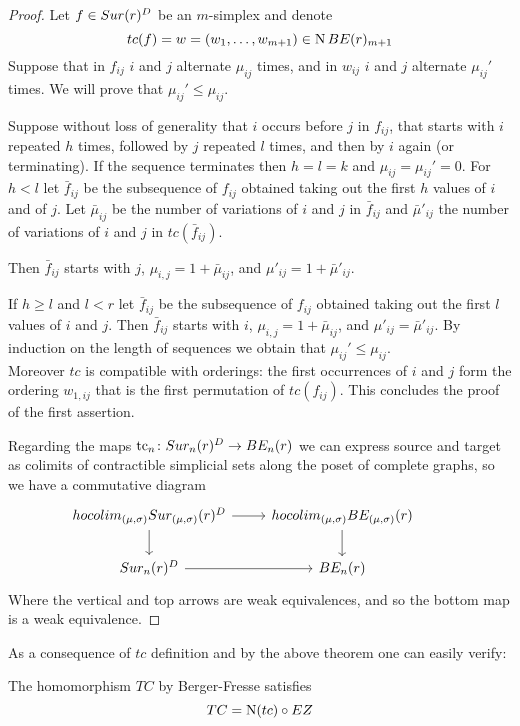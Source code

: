 \begin{proof}
	Let $f\in Sur(r)^{D}$ be an $m$-simplex and denote
	$$tc(f)=w=(w_{1},\dots,w_{m+1})\in \operatorname{N}BE(r)_{m+1}$$
	Suppose that in $f_{ij}$ $i$ and $j$ alternate $\mu_{ij}$ times, and in $w_{ij}$ $i$ and $j$ alternate $\mu_{ij}'$ times.
	We will prove that
	$\mu_{ij}' \leq \mu_{ij}$.

	Suppose without loss of generality that $i$ occurs before $j$ in $f_{ij}$, that starts with $i$ repeated $h$ times, followed by $j$ repeated $l$ times, and
	then by $i$ again (or terminating).
	If the sequence terminates then $h=l=k$ and $\mu_{ij}=\mu_{ij}'=0$.
	For $h <l$
	let $\bar{f}_{ij}$ be the subsequence of $f_{ij}$
	obtained taking out the first $h$ values of $i$ and of $j$.
	Let $\bar{\mu}_{ij}$ be the number of variations of $i$ and $j$ in $\bar{f}_{ij}$
	and $\bar{\mu}'_{ij}$ the number of variations of $i$ and $j$ in $tc(\bar{f}_{ij})$.

	Then $\bar{f}_{ij}$
	starts with $j$,
	$\mu_{i,j}=1+\bar{\mu}_{ij}$,
	and $\mu'_{ij}=1+\bar{\mu}'_{ij}$.

	If $h \geq l$ and $l<r$
	let $\bar{f}_{ij}$ be the subsequence of $f_{ij}$ obtained taking out the first $l$ values of $i$ and $j$.
	Then $\bar{f}_{ij}$
	starts with $i$,
	$\mu_{i,j}=1+\bar{\mu}_{ij}$,
	and $\mu'_{ij}=\bar{\mu}'_{ij}$.
	By induction on the length of sequences we obtain that
	$\mu_{ij}'\le \mu_{ij}$.\\
	Moreover $tc$ is compatible with orderings: the first occurrences of $i$ and $j$ form the ordering $w_{1,ij}$ that is the first permutation of $tc(f_{ij})$.
	This concludes the proof of the first assertion.

Regarding the maps $\operatorname{tc}_{n} \colon Sur_{n}(r)^{D}\rightarrow BE_{n}(r)$ we can express source and target as colimits of contractible %
	simplicial sets along the poset of complete graphs,
	so we have a commutative diagram
	\begin{equation*}
		\begin{tikzcd}			hocolim_{(\mu,\sigma)}\sur_{(\mu,\sigma)}(r)^{D} \arrow[r] \arrow[d]& hocolim_{(\mu,\sigma)}\BE_{(\mu,\sigma)}(r) \arrow[d] \\
			\sur_{n}(r)^{D}\arrow[r] & \BE_{n}(r)&
		\end{tikzcd}
	\end{equation*}
	Where the vertical and top arrows
	are weak equivalences, and so the bottom map is a weak equivalence.
\end{proof}
As a consequence of $tc$ definition and by the above theorem one can easily verify:
\begin{proposition}
    The homomorphism $TC$ by Berger-Fresse satisfies $$TC=\operatorname{N}(tc)\circ EZ $$
\end{proposition}


